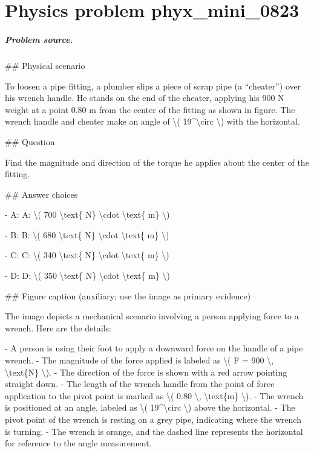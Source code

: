 
\chapter{Physics problem phyx\_mini\_0823}
\label{ch:PhyXMiniProblems_problem_phyx_mini_0823}

\paragraph{Problem source.}
\#\# Physical scenario

To loosen a pipe fitting, a plumber slips a piece of scrap pipe (a ``cheater'') over his wrench handle. He stands on the end of the cheater, applying his 900 N weight at a point 0.80 m from the center of the fitting as shown in figure. The wrench handle and cheater make an angle of \textbackslash{}( 19\textasciicircum{}\textbackslash{}circ \textbackslash{}) with the horizontal.

\#\# Question

Find the magnitude and direction of the torque he applies about the center of the fitting.

\#\# Answer choices

- A: A: \textbackslash{}( 700 \textbackslash{}text\{ N\} \textbackslash{}cdot \textbackslash{}text\{ m\} \textbackslash{})

- B: B: \textbackslash{}( 680 \textbackslash{}text\{ N\} \textbackslash{}cdot \textbackslash{}text\{ m\} \textbackslash{})

- C: C: \textbackslash{}( 340 \textbackslash{}text\{ N\} \textbackslash{}cdot \textbackslash{}text\{ m\} \textbackslash{})

- D: D: \textbackslash{}( 350 \textbackslash{}text\{ N\} \textbackslash{}cdot \textbackslash{}text\{ m\} \textbackslash{})

\#\# Figure caption (auxiliary; use the image as primary evidence)

The image depicts a mechanical scenario involving a person applying force to a wrench. Here are the details:

- A person is using their foot to apply a downward force on the handle of a pipe wrench.
- The magnitude of the force applied is labeled as \textbackslash{}( F = 900 \textbackslash{}, \textbackslash{}text\{N\} \textbackslash{}).
- The direction of the force is shown with a red arrow pointing straight down.
- The length of the wrench handle from the point of force application to the pivot point is marked as \textbackslash{}( 0.80 \textbackslash{}, \textbackslash{}text\{m\} \textbackslash{}).
- The wrench is positioned at an angle, labeled as \textbackslash{}( 19\textasciicircum{}\textbackslash{}circ \textbackslash{}) above the horizontal.
- The pivot point of the wrench is resting on a grey pipe, indicating where the wrench is turning.
- The wrench is orange, and the dashed line represents the horizontal for reference to the angle measurement.

